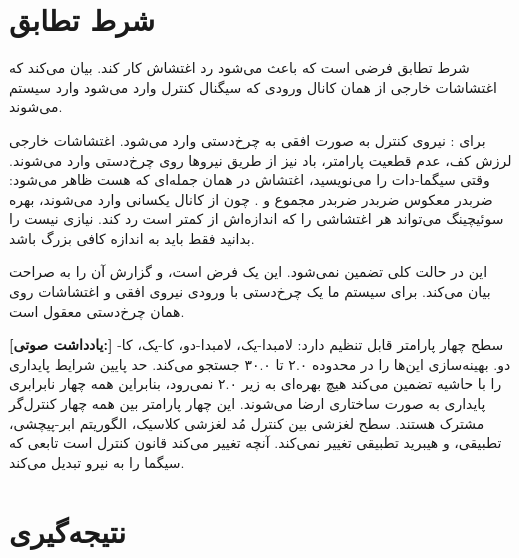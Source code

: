 \documentclass[12pt, a4paper]{article}
\newcommand{\dash}{\lr{---}}
\begin{document}
\section{شرط تطابق}

شرط تطابق فرضی است که باعث می‌شود رد اغتشاش  کار کند. بيان می‌کند که اغتشاشات خارجی از همان کانال ورودی که سيگنال کنترل وارد می‌شود وارد سيستم می‌شوند.

برای : نيروی کنترل به صورت افقی به چرخ‌دستی وارد می‌شود. اغتشاشات خارجی \dash{} لرزش کف، عدم قطعيت پارامتر، باد \dash{} نيز از طريق نيروها روی چرخ‌دستی وارد می‌شوند. وقتی سيگما-دات را می‌نويسيد، اغتشاش  در همان جمله‌ای که  هست ظاهر می‌شود:  ضربدر معکوس  ضربدر  ضربدر مجموع  و . چون از کانال يکسانی وارد می‌شوند، بهره سوئيچينگ  می‌تواند هر اغتشاشی را که اندازه‌اش از  کمتر است رد کند. نيازی نيست  را بدانيد \dash{} فقط بايد  به اندازه کافی بزرگ باشد.

اين در حالت کلی تضمين نمی‌شود. اين يک فرض است، و گزارش آن را به صراحت بيان می‌کند. برای سيستم ما \dash{} يک چرخ‌دستی با ورودی نيروی افقی و اغتشاشات روی همان چرخ‌دستی \dash{} معقول است.


\begin{mdframed}[
  backgroundcolor=audiotan,
  linecolor=audionote!70,
  linewidth=1pt,
  innerleftmargin=12pt,
  innerrightmargin=12pt,
  innertopmargin=8pt,
  innerbottommargin=8pt
]
\textbf{\color{audionote}[يادداشت صوتی:]}
سطح چهار پارامتر قابل تنظيم دارد: لامبدا-يک، لامبدا-دو، کا-يک، کا-دو. بهينه‌سازی اين‌ها را در محدوده ۲.۰ تا ۳۰.۰ جستجو می‌کند. حد پايين شرايط پايداری را با حاشيه تضمين می‌کند \dash{} هيچ بهره‌ای به زير ۲.۰ نمی‌رود، بنابراين همه چهار نابرابری پايداری به صورت ساختاری ارضا می‌شوند. اين چهار پارامتر بين همه چهار کنترل‌گر مشترک هستند. سطح لغزشی بين کنترل مُد لغزشی کلاسيک، الگوريتم ابر-پيچشی، تطبيقی، و هيبريد تطبيقی تغيير نمی‌کند. آنچه تغيير می‌کند قانون کنترل است \dash{} تابعی که سيگما را به نيرو تبديل می‌کند.
\end{mdframed}

\vspace{0.6cm}

\section{نتيجه‌گيری}
\end{document}
